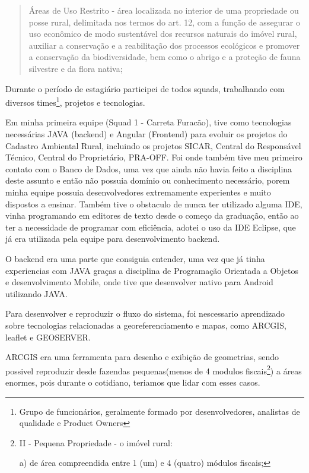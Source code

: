 \begin{quote}
    Áreas de Uso Restrito -  área localizada no interior de uma propriedade ou posse rural, delimitada nos termos do art. 12, com a função de assegurar o uso econômico de modo sustentável dos recursos naturais do imóvel rural, auxiliar a conservação e a reabilitação dos processos ecológicos e promover a conservação da biodiversidade, bem como o abrigo e a proteção de fauna silvestre e da flora nativa;
\cite{brasil2012}

\end{quote}

Durante o período de estagiário participei de todos squads, trabalhando com diversos times\footnote{Grupo de funcionários, geralmente formado por desenvolvedores, analistas de qualidade e Product Owners}, projetos e tecnologias.

Em minha primeira equipe (Squad 1 - Carreta Furacão), tive como tecnologias necessárias JAVA (backend) e Angular (Frontend) para evoluir os projetos do Cadastro Ambiental Rural, incluindo os projetos SICAR, Central do Responsável Técnico, Central do Proprietário, PRA-OFF.
Foi onde também tive meu primeiro contato com o Banco de Dados, uma vez que ainda não havia feito a disciplina deste assunto e então não possuia domínio ou conhecimento necessário, porem minha equipe possuia desenvolvedores extremamente experientes e muito dispostos a ensinar.
Também tive o obstaculo de nunca ter utilizado alguma IDE, vinha programando em editores de texto desde o começo da graduação, então ao ter a necessidade de programar com eficiência, adotei o uso da IDE Eclipse, que já era utilizada pela equipe para desenvolvimento backend.

O backend era uma parte que consiguia entender, uma vez que já tinha experiencias com JAVA graças a disciplina de Programação Orientada a Objetos e desenvolvimento Mobile, onde tive que desenvolver nativo para Android utilizando JAVA.

Para desenvolver e reproduzir o fluxo do sistema, foi nescessario aprendizado sobre tecnologias relacionadas a georeferenciamento e mapas, como ARCGIS, leaflet e GEOSERVER.

ARCGIS era uma ferramenta para desenho e exibição de geometrias, sendo possivel reproduzir desde fazendas pequenas(menos de 4 modulos fiscais\footnote{II - Pequena Propriedade - o imóvel rural:

a) de área compreendida entre 1 (um) e 4 (quatro) módulos fiscais;\cite{brasil1993}}) a áreas enormes, pois durante o cotidiano, teriamos que lidar com esses casos.

